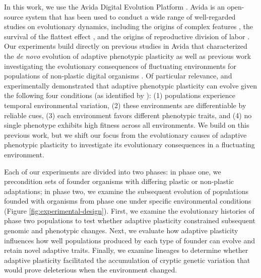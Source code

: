 In this work, we use the Avida Digital Evolution Platform \citep{ofria_avida:_2009}.
Avida is an open-source system that has been used to conduct a wide range of well-regarded studies on evolutionary dynamics, including
the origins of complex features \citep{lenski_evolutionary_2003},
the survival of the flattest effect \citep{wilke_evolution_2001},
and the origins of reproductive division of labor \citep{goldsby_evolutionary_2014}.
Our experiments build directly on previous studies in Avida that characterized the \textit{de novo} evolution of adaptive phenotypic plasticity \citep{clune_investigating_2007,lalejini_evolutionary_2016} as well as previous work investigating the evolutionary consequences of fluctuating environments for populations of non-plastic digital organisms \citep{li_digital_2004,canino-koning_fluctuating_2019}.
Of particular relevance, \cite{clune_investigating_2007} and \cite{lalejini_evolutionary_2016} experimentally demonstrated that adaptive phenotypic plasticity can evolve given the following four conditions (as identified by \citealt{ghalambor_behavior_2010}):
(1) populations experience temporal environmental variation,
(2) these environments are differentiable by reliable cues,
(3) each environment favors different phenotypic traits,
and (4) no single phenotype exhibits high fitness across all environments.
We build on this previous work, but we shift our focus from the evolutionary causes of adaptive phenotypic plasticity to investigate its evolutionary consequences in a fluctuating environment.


Each of our experiments are divided into two phases: in phase one, we precondition sets of founder organisms with differing plastic or non-plastic adaptations;
in phase two, we examine the subsequent evolution of populations founded with organisms from phase one under specific environmental conditions (Figure \ref{fig:experimental-design}).
First, we examine the evolutionary histories of phase two populations to test whether adaptive plasticity constrained subsequent genomic and phenotypic changes.
Next, we evaluate how adaptive plasticity influences how well populations produced by each type of founder can evolve and retain novel adaptive traits.
Finally, we examine lineages to determine whether adaptive plasticity facilitated the accumulation of cryptic genetic variation that would prove deleterious when the environment changed.

